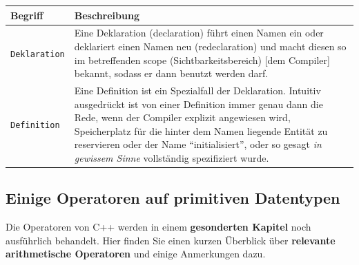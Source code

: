 \documentclass[a4paper]{report}
\begin{document}
\begin{center}
\begin{tabular}{|p{3cm}|p{12cm}|}
	\hline
	\textbf{Begriff} & \textbf{Beschreibung} \\ \hline
	\texttt{Deklaration} & Eine Deklaration (declaration) führt einen Namen ein oder deklariert einen Namen neu (redeclaration) und macht diesen so im betreffenden scope (Sichtbarkeitsbereich) [dem Compiler] bekannt, sodass er dann benutzt werden darf. \\ \hline
	\texttt{Definition} & Eine Definition ist ein Spezialfall der Deklaration. Intuitiv ausgedrückt ist von einer Definition immer genau dann die Rede, wenn der Compiler explizit angewiesen wird, Speicherplatz für die hinter dem Namen liegende Entität zu reservieren oder der Name "`initialisiert"', oder so gesagt \textit{in gewissem Sinne} vollständig spezifiziert wurde. \\ \hline %
\end{tabular}
\end{center}

%	



\subsection{Einige Operatoren auf primitiven Datentypen}
Die Operatoren von C++ werden in einem \textbf{gesonderten Kapitel} noch ausführlich behandelt. Hier finden Sie einen kurzen Überblick über \textbf{relevante arithmetische Operatoren} und einige Anmerkungen dazu.
\end{document}

